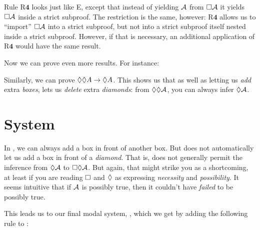 Rule R$\mathbf{4}$ looks just like {\ebox}E, except that instead of yielding $\mathcal{A}$ from $\Box\mathcal{A}$ it yields $\Box\mathcal{A}$ inside a strict subproof. The restriction is the same, however: R$\mathbf{4}$ allows us to ``import'' $\Box \mathcal{A}$ into a strict subproof, but not into a strict subproof itself nested inside a strict subproof. However, if that is necessary, an additional application of R$\mathbf{4}$ would have the same result.

Now we can prove even more results. For instance:
\begin{fitchproof}
	\open
	\AS
	\open
	\AS
	\close
	\close
\end{fitchproof}
Similarly, we can prove $\Diamond\Diamond A \rightarrow \Diamond A$. This shows us that as well as letting us \emph{add} extra \emph{boxes}, \mlSfour{} lets us \emph{delete} extra \emph{diamonds}: from $\Diamond\Diamond \mathcal{A}$, you can always infer $\Diamond\mathcal{A}$.

\section{System \mlSfive}
\label{S5}

In \mlSfour, we can always add a box in front of another box. But \mlSfour{} does not automatically let us add a box in front of a \emph{diamond}. That is, \mlSfour{} does not generally permit the inference from $\Diamond\mathcal{A}$ to $\Box\Diamond\mathcal{A}$. But again, that might strike you as a shortcoming, at least if you are reading $\Box$ and $\Diamond$ as expressing \emph{necessity} and \emph{possibility}. It seems intuitive that if $\mathcal{A}$ is possibly true, then it couldn't have \emph{failed} to be possibly true.

This leads us to our final modal system, \mlSfive, which we get by adding the following rule to \mlSfour:

